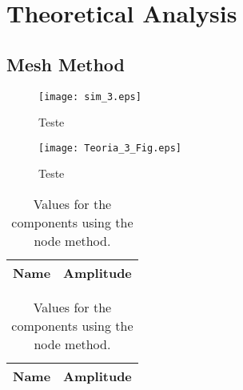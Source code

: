\section{Theoretical Analysis}
\label{sec:analysis}

\subsection{Mesh Method}
\label{subsec:mesh}

\begin{figure}[!ht] 
\caption{Teste}
\texttt{[image: sim\_3.eps]}
\end{figure}


\begin{figure}[!ht]
\caption{Teste}
\texttt{[image: Teoria\_3\_Fig.eps]}
\end{figure}




\begin{table}[h]
  \centering
  \begin{tabular}{|l|r|}
    \hline    
    {\bf Name} & {\bf Amplitude} \\ \hline
    
  \end{tabular}
  \caption{Values for the components using the node method.}
  \label{tab4_Amp}
\end{table}


\begin{table}[h]
  \centering
  \begin{tabular}{|l|r|}
    \hline    
    {\bf Name} & {\bf Amplitude} \\ \hline
    
  \end{tabular}
  \caption{Values for the components using the node method.}
  \label{tab4_Arg}
\end{table}


